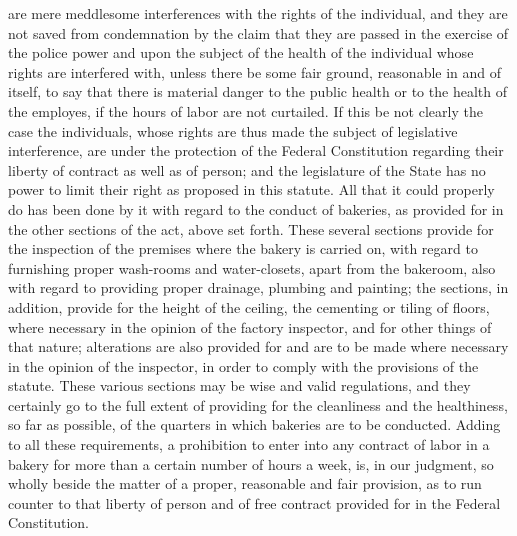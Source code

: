 \documentclass[
  letterpaper,
  11pt,
  DIV=9,
  openright]{scrbook}
\begin{document}
are mere meddlesome interferences with the rights of the individual, and
they are not saved from condemnation by the claim that they are passed
in the exercise of the police power and upon the subject of the health
of the individual whose rights are interfered with, unless there be some
fair ground, reasonable in and of itself, to say that there is material
danger to the public health or to the health of the employes, if the
hours of labor are not curtailed. If this be not clearly the case the
individuals, whose rights are thus made the subject of legislative
interference, are under the protection of the Federal Constitution
regarding their liberty of contract as well as of person; and the
legislature of the State has no power to limit their right as proposed
in this statute. All that it could properly do has been done by it with
regard to the conduct of bakeries, as provided for in the other sections
of the act, above set forth. These several sections provide for the
inspection of the premises where the bakery is carried on, with regard
to furnishing proper wash-rooms and water-closets, apart from the
bakeroom, also with regard to providing proper drainage, plumbing and
painting; the sections, in addition, provide for the height of the
ceiling, the cementing or tiling of floors, where necessary in the
opinion of the factory inspector, and for other things of that nature;
alterations are also provided for and are to be made where necessary in
the opinion of the inspector, in order to comply with the provisions of
the statute. These various sections may be wise and valid regulations,
and they certainly go to the full extent of providing for the
cleanliness and the healthiness, so far as possible, of the quarters in
which bakeries are to be conducted. Adding to all these requirements, a
prohibition to enter into any contract of labor in a bakery for more
than a certain number of hours a week, is, in our judgment, so wholly
beside the matter of a proper, reasonable and fair provision, as to run
counter to that liberty of person and of free contract provided for in
the Federal Constitution.
\end{document}
